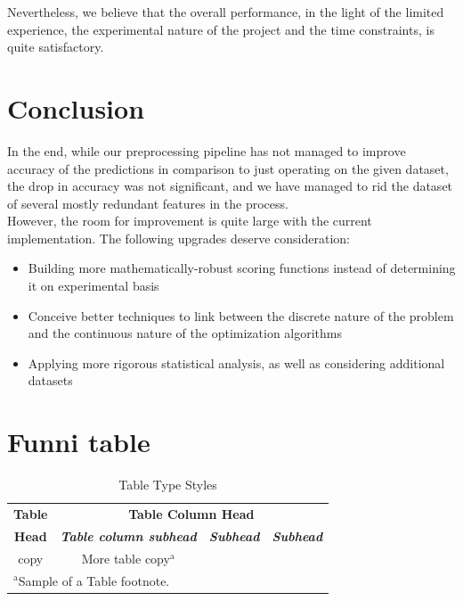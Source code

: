 \documentclass[conference]{IEEEtran}
\begin{document}
Nevertheless, we believe that the overall performance, in the light of the limited experience, the experimental nature of the project and the time constraints, is quite satisfactory.


\section{Conclusion}

In the end, while our preprocessing pipeline has not managed to improve accuracy of the predictions in comparison to just operating on the given dataset, the drop in accuracy was not significant, and we have managed to rid the dataset of several mostly redundant features in the process. \\

However, the room for improvement is quite large with the current implementation. The following upgrades deserve consideration:
\begin{itemize}
	\item Building more mathematically-robust scoring functions instead of determining it on experimental basis
	\item Conceive better techniques to link between the discrete nature of the problem and the continuous nature of the optimization algorithms
	\item Applying more rigorous statistical analysis, as well as considering additional datasets
\end{itemize}




\section{Funni table}

\begin{table}[htbp]
\caption{Table Type Styles}
\begin{center}
\begin{tabular}{|c|c|c|c|}
\hline
\textbf{Table}&\multicolumn{3}{|c|}{\textbf{Table Column Head}} \\
\cline{2-4} 
\textbf{Head} & \textbf{\textit{Table column subhead}}& \textbf{\textit{Subhead}}& \textbf{\textit{Subhead}} \\
\hline
copy& More table copy$^{\mathrm{a}}$& &  \\
\hline
\multicolumn{4}{l}{$^{\mathrm{a}}$Sample of a Table footnote.}
\end{tabular}
\label{tab1}
\end{center}
\end{table}
\end{document}
